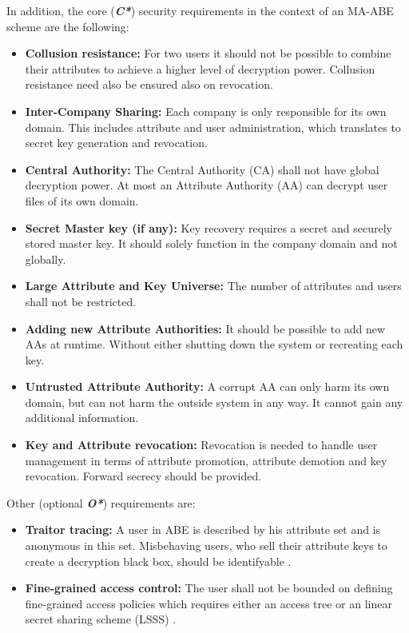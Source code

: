 In addition, the core (\textbf{\textit{C*}}) security requirements in the context of an \ac{MA-ABE} scheme are the following:
\begin{itemize}
\item[\req{C1}] \textbf{Collusion resistance:} For two users it should not be possible to combine their attributes to achieve a higher level of decryption power. Collusion resistance need also be ensured also on revocation. 
\item[\req{C2}] \textbf{Inter-Company Sharing:} Each company is only responsible for its own domain. This includes attribute and user administration, which translates to secret key generation and revocation. 
\item[\req{C3}] \textbf{Central Authority:} The Central Authority (\ac{CA}) shall not have global decryption power. At most an Attribute Authority (\ac{AA}) can decrypt user files of its own domain.  
\item[\req{C4}] \textbf{Secret Master key (if any):} Key recovery requires a secret and securely stored master key. It should solely function in the company domain and not globally. 
\item[\req{C5}] \textbf{Large Attribute and Key Universe:} The number of attributes and users shall not be restricted.
\item[\req{C6}] \textbf{Adding new Attribute Authorities:} It should be possible to add new AAs at runtime. Without either shutting down the system or recreating each key.
\item[\req{C7}] \textbf{Untrusted Attribute Authority:} A corrupt AA can only harm its own domain, but can not harm the outside system in any way. It cannot gain any additional information.
\item[\req{C8}] \textbf{Key and Attribute revocation:} Revocation is needed to handle user management in terms of attribute promotion, attribute demotion and key revocation. Forward secrecy should be provided.
\end{itemize}

\noindent Other (optional \textbf{\textit{O*}}) requirements are: 
\begin{itemize}
	\item[\req{O1}] \textbf{Traitor tracing:} A user in \ac{ABE} is described by his attribute set and is anonymous in this set. Misbehaving users, who sell their attribute keys to create a decryption black box, should be identifyable \cite{liu2016practical}.
	\item[\req{O2}] \textbf{Fine-grained access control:} The user shall not be bounded on defining fine-grained access policies which requires either an access tree \cite{bethencourt2007ciphertext} or an linear secret sharing scheme (\ac{LSSS}) \cite{yang2013dac} \cite{li2016secure} \cite{wu2017security} \cite{li2013matrix} \cite{liu2016practical}.
\end{itemize}

